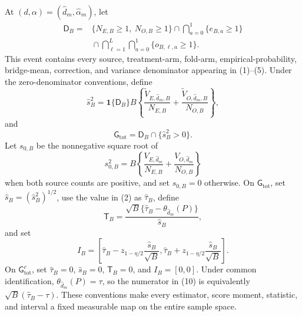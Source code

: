 At \((d,\alpha)=(\widehat d_m,\widehat\alpha_m)\), let
\[
\begin{aligned}
 \mathsf D_B
 ={}&\{N_{E,B}\ge1,\ N_{O,B}\ge1\}
 \cap\bigcap_{a=0}^1\{e_{B,a}\ge1\}\\
 &{}\cap\bigcap_{\ell=1}^L\bigcap_{a=0}^1
 \{o_{B,\ell,a}\ge1\}.
\end{aligned}                                               \tag{6}
\]
This event contains every source, treatment-arm, fold-arm, empirical-probability, bridge-mean, correction, and variance denominator appearing in (1)--(5). Under the zero-denominator conventions, define
\[
 \widehat s_B^2
 =\mathbf 1\{\mathsf D_B\}B\left\{
 \frac{\widetilde V_{E,\widehat d_m,B}}{N_{E,B}}
 +\frac{\widetilde V_{O,\widehat d_m,B}}{N_{O,B}}
 \right\},                                                 \tag{7}
\]
and
\[
 \mathsf G_{\mathrm{tot}}
 =\mathsf D_B\cap\{\widehat s_B^2>0\}.                    \tag{8}
\]
Let \(s_{0,B}\) be the nonnegative square root of
\[
 s_{0,B}^2
 =B\left\{
 \frac{V_{E,\widehat d_m}}{N_{E,B}}
 +\frac{V_{O,\widehat d_m}}{N_{O,B}}
 \right\}                                                  \tag{9}
\]
when both source counts are positive, and set \(s_{0,B}=0\) otherwise. On \(\mathsf G_{\mathrm{tot}}\), set \(\widehat s_B=(\widehat s_B^2)^{1/2}\), use the value in (2) as \(\widehat\tau_B\), define
\[
 \mathsf T_B
 =\frac{\sqrt B\{\widehat\tau_B-\theta_{\widehat d_m}(P)\}}
 {\widehat s_B},                                            \tag{10}
\]
and set
\[
 I_B=\left[
 \widehat\tau_B-z_{1-\eta/2}\frac{\widehat s_B}{\sqrt B},
 \widehat\tau_B+z_{1-\eta/2}\frac{\widehat s_B}{\sqrt B}
 \right].                                                   \tag{11}
\]
On \(\mathsf G_{\mathrm{tot}}^c\), set \(\widehat\tau_B=0\), \(\widehat s_B=0\), \(\mathsf T_B=0\), and \(I_B=[0,0]\). Under common identification, \(\theta_{\widehat d_m}(P)=\tau\), so the numerator in (10) is equivalently \(\sqrt B(\widehat\tau_B-\tau)\). These conventions make every estimator, score moment, statistic, and interval a fixed measurable map on the entire sample space.